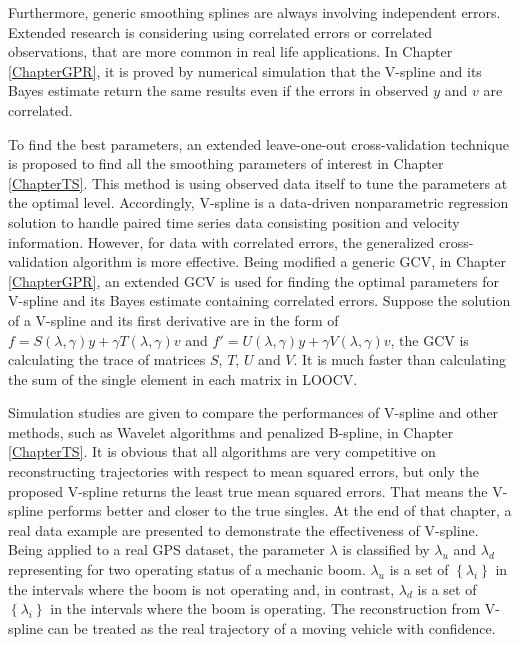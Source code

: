 Furthermore, generic smoothing splines are always involving independent errors. Extended research is considering using correlated errors or correlated observations, that are more common in real life applications. In Chapter \ref{ChapterGPR}, it is proved by numerical simulation that the V-spline and its Bayes estimate return the same results even if the errors in observed $y$ and $v$ are correlated.  

To find the best parameters, an extended leave-one-out cross-validation technique is proposed to find all the smoothing parameters of interest in Chapter \ref{ChapterTS}. This method is using observed data itself to tune the parameters at the optimal level. Accordingly, V-spline is a data-driven nonparametric regression solution to handle paired time series data consisting position and velocity information. However, for data with correlated errors, the generalized cross-validation algorithm is more effective. Being modified a generic GCV, in Chapter \ref{ChapterGPR}, an extended GCV is used for finding the optimal parameters for V-spline and its Bayes estimate containing correlated errors. Suppose the solution of a V-spline and its first derivative are in the form of $f=S(\lambda,\gamma)y+\gamma T(\lambda,\gamma)v$ and $f'=U(\lambda,\gamma)y+\gamma V(\lambda,\gamma)v$, the GCV is calculating the trace of matrices $S$, $T$, $U$ and $V$. It is much faster than calculating the sum of the single element in each matrix in LOOCV. 

Simulation studies are given to compare the performances of V-spline and other methods, such as Wavelet algorithms and penalized B-spline, in Chapter \ref{ChapterTS}. It is obvious that all algorithms are very competitive on reconstructing trajectories with respect to mean squared errors, but only the proposed V-spline returns the least true mean squared errors. That means the V-spline performs better and closer to the true singles. At the end of that chapter, a real data example are presented to demonstrate the effectiveness of V-spline. Being applied to a real GPS dataset, the parameter $\lambda$ is classified by $\lambda_u$ and $\lambda_d$ representing for two operating status of a mechanic boom. $\lambda_u$ is a set of $\left\lbrace\lambda_i\right\rbrace$ in the intervals where the boom is not operating and, in contrast, $\lambda_d$ is a set of $\left\lbrace\lambda_i\right\rbrace$ in the intervals where the boom is operating. The reconstruction from V-spline can be treated as the real trajectory of a moving vehicle with confidence. 

